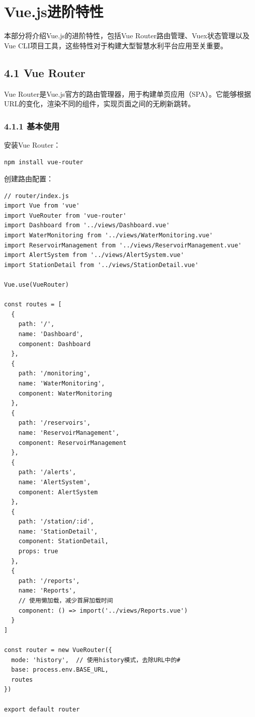 \section{Vue.js进阶特性}\label{vue.jsux8fdbux9636ux7279ux6027}

本部分将介绍Vue.js的进阶特性，包括Vue
Router路由管理、Vuex状态管理以及Vue
CLI项目工具，这些特性对于构建大型智慧水利平台应用至关重要。

\subsection{4.1 Vue Router}\label{vue-router}

Vue
Router是Vue.js官方的路由管理器，用于构建单页应用（SPA）。它能够根据URL的变化，渲染不同的组件，实现页面之间的无刷新跳转。

\subsubsection{4.1.1 基本使用}\label{ux57faux672cux4f7fux7528}

安装Vue Router：

\begin{lstlisting}[language=bash]
npm install vue-router
\end{lstlisting}

创建路由配置：

\begin{lstlisting}
// router/index.js
import Vue from 'vue'
import VueRouter from 'vue-router'
import Dashboard from '../views/Dashboard.vue'
import WaterMonitoring from '../views/WaterMonitoring.vue'
import ReservoirManagement from '../views/ReservoirManagement.vue'
import AlertSystem from '../views/AlertSystem.vue'
import StationDetail from '../views/StationDetail.vue'

Vue.use(VueRouter)

const routes = [
  {
    path: '/',
    name: 'Dashboard',
    component: Dashboard
  },
  {
    path: '/monitoring',
    name: 'WaterMonitoring',
    component: WaterMonitoring
  },
  {
    path: '/reservoirs',
    name: 'ReservoirManagement',
    component: ReservoirManagement
  },
  {
    path: '/alerts',
    name: 'AlertSystem',
    component: AlertSystem
  },
  {
    path: '/station/:id',
    name: 'StationDetail',
    component: StationDetail,
    props: true
  },
  {
    path: '/reports',
    name: 'Reports',
    // 使用懒加载，减少首屏加载时间
    component: () => import('../views/Reports.vue')
  }
]

const router = new VueRouter({
  mode: 'history',  // 使用history模式，去除URL中的#
  base: process.env.BASE_URL,
  routes
})

export default router
\end{lstlisting}


